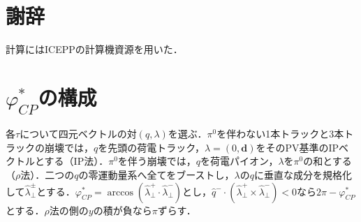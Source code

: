 \documentclass[paper=a4,fontsize=10pt,jafontsize=10pt,line_length=44zw,number_of_lines=46]{jlreq}
\newcommand{\phicp}{\varphi^{*}_{CP}}
\begin{document}
\section*{謝辞}
計算にはICEPPの計算機資源を用いた．

\appendix
\section{$\phicp$の構成}\label{app:phicp}

各$\tau$について四元ベクトルの対$(q,\lambda)$を選ぶ．$\pi^0$を伴わない1本トラックと3本トラックの崩壊では，$q$を先頭の荷電トラック，$\lambda=(0,\boldsymbol d)$をそのPV基準のIPベクトルとする（IP法）．$\pi^0$を伴う崩壊では，$q$を荷電パイオン，$\lambda$を$\pi^0$の和とする（$\rho$法）．二つの$q$の零運動量系へ全てをブーストし，$\lambda$の$q$に垂直な成分を規格化して$\hat\lambda^\pm_\perp$とする．$\phicp=\arccos(\hat\lambda^+_\perp\cdot\hat\lambda^-_\perp)$とし，$\hat q^-\cdot(\hat\lambda^+_\perp\times\hat\lambda^-_\perp)<0$なら$2\pi-\phicp$とする．$\rho$法の側の$y$の積が負なら$\pi$ずらす．
\end{document}
